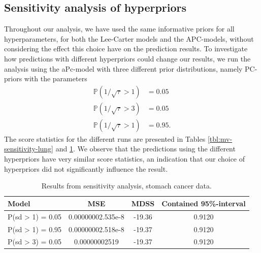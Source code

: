 \subsection{Sensitivity analysis of hyperpriors}
Throughout our analysis, we have used the same informative priors for all hyperparameters, for both the Lee-Carter models and the APC-models, without considering the effect this choice have on the prediction results. To investigate how predictions with different hyperpriors could change our results, we run the analysis using the aPc-model with three different prior distributions, namely PC-priors with the parameters
\begin{equation}
    \begin{aligned}
        \mathbb{P}(1/\sqrt{\tau} > 1) & = 0.05 \\
        \mathbb{P}(1/\sqrt{\tau} > 3) & = 0.05 \\
        \mathbb{P}(1/\sqrt{\tau} > 1) & = 0.95.
    \end{aligned}
\end{equation}
The score statistics for the different runs are presented in Tables \ref{tbl:mv-sensitivity-lung} and \ref{tbl:mv-sensitivity-stomach}. We observe that the predictions using the different hyperpriors have very similar score statistics, an indication that our choice of hyperpriors did not significantly influence the result. 


\begin{table}
    \begin{center}
        \begin{tabular}{l |c c c }
        Model & MSE &   MDSS & Contained 95\%-interval\\
        \hline
        P(sd > 1) = 0.05 & 0.00000002.535e-8 & -19.36    & 0.9120\\
        P(sd > 1) = 0.95 & 0.00000002.518e-8 & -19.37    & 0.9120\\
        P(sd > 3) = 0.05 & 0.00000002519 & -19.37    & 0.9120\\
        \end{tabular}
    \caption{Results from sensitivity analysis, stomach cancer data.}\label{tbl:mv-sensitivity-stomach}
    \end{center}
\end{table}

